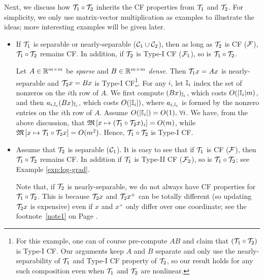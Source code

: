 Next, we discuss how ${\mathcal{T}}_1\circ {\mathcal{T}}_2$ inherits the CF properties from ${\mathcal{T}}_1$ and ${\mathcal{T}}_2$. For simplicity, we only use matrix-vector multiplication as examples to illustrate the ideas; more interesting examples will be given later.%
\begin{itemize}

\item If ${\mathcal{T}}_1$ is separable or nearly-separable (${\mathcal{C}}_1\cup{\mathcal{C}}_2$), then as long as ${\mathcal{T}}_2$ is CF (${\mathcal{F}}$), ${\mathcal{T}}_1\circ{\mathcal{T}}_2$ remains CF. In addition, if ${\mathcal{T}}_2$ is Type-I CF (${\mathcal{F}}_1$), so is ${\mathcal{T}}_1\circ{\mathcal{T}}_2$.
\begin{example}\label{exp:sp-dens}
Let $A\in\mathbb{R}^{m\times m}$ be \emph{sparse} and $B\in\mathbb{R}^{m\times m}$ \emph{dense}. Then ${\mathcal{T}}_1 x=Ax$ is nearly-separable and ${\mathcal{T}}_2 x=Bx$ is Type-I CF\footnote{For this example, one can of course pre-compute $AB$ and claim that $({\mathcal{T}}_1\circ{\mathcal{T}}_2)$ is Type-I CF. Our arguments keep $A$ and $B$ separate and only use the nearly-separability of ${\mathcal{T}}_1$ and Type-I CF property of ${\mathcal{T}}_2$, so our result holds for any such composition even when ${\mathcal{T}}_1$ and ${\mathcal{T}}_2$ are nonlinear.}.  For any $i$, let $\mathbb{I}_i$ index the set of nonzeros on the $i$th row of $A$. We first compute $(Bx)_{\mathbb{I}_i}$, which costs $O(|\mathbb{I}_i|m)$, and then $a_{i,\mathbb{I}_i} (Bx)_{\mathbb{I}_i}$, which costs $O(|\mathbb{I}_i|)$, where $a_{i,\mathbb{I}_i}$ is formed by the nonzero entries on the $i$th row of $A$. Assume $O(|\mathbb{I}_i|)=O(1),\,\forall i$. We have, from the above discussion, that $\mathfrak{M}\left[{x}\mapsto {({\mathcal{T}}_1\circ{\mathcal{T}}_2 x)_i}\right]=O(m)$,
while $\mathfrak{M}\left[{x}\mapsto {{\mathcal{T}}_1\circ{\mathcal{T}}_2 x}\right]=O(m^2)$. Hence, ${\mathcal{T}}_1\circ{\mathcal{T}}_2$ is Type-I CF.
\end{example}


\item Assume that ${\mathcal{T}}_2$ is separable (${\mathcal{C}}_1$). It is easy to see that if ${\mathcal{T}}_1$ is CF (${\mathcal{F}}$), then ${\mathcal{T}}_1\circ {\mathcal{T}}_2$ remains CF. In addition if ${\mathcal{T}}_1$ is Type-II CF (${\mathcal{F}}_2$), so is ${\mathcal{T}}_1\circ{\mathcal{T}}_2$; see Example \ref{exp:log-grad}. %

Note that, if ${\mathcal{T}}_2$ is nearly-separable, we do not always have CF properties for ${\mathcal{T}}_1\circ{\mathcal{T}}_2$. This is because ${\mathcal{T}}_2 x$ and ${\mathcal{T}}_2 x^+$ can be totally different (so updating ${\mathcal{T}}_2 x$ is expensive) even if $x$ and $x^+$ only differ  over one coordinate; see the  footnote~\ref{note1} on Page \pageref{note1}. %



\end{itemize}
